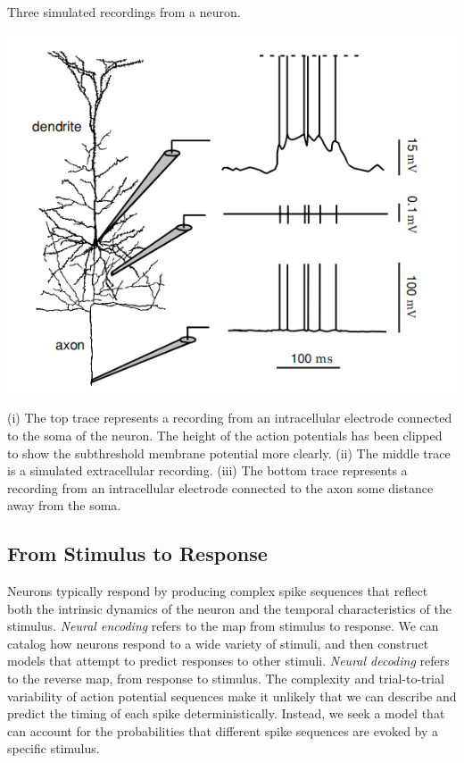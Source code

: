\begin{exm}
  Three simulated recordings from a neuron.
  \begin{center}
    \label{fig:1.3}
    \includegraphics[scale = 0.35]{png/Figure1-3}\\
  \end{center}
  (i) The top trace represents a recording from an intracellular electrode connected to the soma of the neuron. The height of the action potentials has been clipped to show the subthreshold membrane potential more clearly. (ii) The middle trace is a simulated extracellular recording. (iii) The bottom trace represents a recording from an intracellular electrode connected to the axon some distance away from the soma.
\end{exm}



\subsection{From Stimulus to Response}
\rem  Neurons typically respond by producing complex spike sequences that reflect both the intrinsic dynamics of the neuron and the temporal characteristics of the stimulus.
 \emph{Neural encoding} refers to the map from stimulus to response.
\exm We can catalog how neurons respond to a wide variety of stimuli, and then construct models that attempt to predict responses to other stimuli.
 \emph{Neural decoding} refers to the reverse map, from response to stimulus.
\rem The complexity and trial-to-trial variability of action potential sequences make it unlikely that we can describe and predict the timing of each spike deterministically. Instead, we seek a model that can account for the probabilities that different spike sequences are evoked by a specific stimulus.


